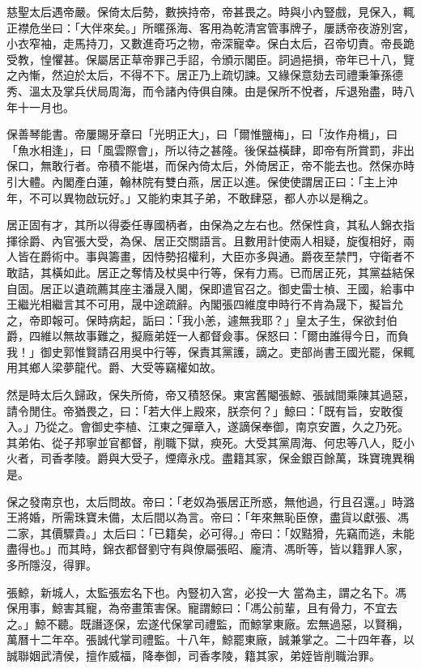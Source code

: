 \begin{pinyinscope}
慈聖太后遇帝嚴。保倚太后勢，數挾持帝，帝甚畏之。時與小內豎戲，見保入，輒正襟危坐曰：「大伴來矣。」所暱孫海、客用為乾清宮管事牌子，屢誘帝夜游別宮，小衣窄袖，走馬持刀，又數進奇巧之物，帝深寵幸。保白太后，召帝切責。帝長跪受教，惶懼甚。保屬居正草帝罪己手詔，令頒示閣臣。詞過挹損，帝年已十八，覽之內慚，然迫於太后，不得不下。居正乃上疏切諫。又緣保意劾去司禮秉筆孫德秀、溫太及掌兵伏局周海，而令諸內侍俱自陳。由是保所不悅者，斥退殆盡，時八年十一月也。

保善琴能書。帝屢賜牙章曰「光明正大」，曰「爾惟鹽梅」，曰「汝作舟楫」，曰「魚水相逢」，曰「風雲際會」，所以待之甚隆。後保益橫肆，即帝有所賞罰，非出保口，無敢行者。帝積不能堪，而保內倚太后，外倚居正，帝不能去也。然保亦時引大體。內閣產白蓮，翰林院有雙白燕，居正以進。保使使謂居正曰：「主上沖年，不可以異物啟玩好。」又能約束其子弟，不敢肆惡，都人亦以是稱之。

居正固有才，其所以得委任專國柄者，由保為之左右也。然保性貪，其私人錦衣指揮徐爵、內官張大受，為保、居正交關語言。且數用計使兩人相疑，旋復相好，兩人皆在爵術中。事與籌畫，因恃勢招權利，大臣亦多與通。爵夜至禁門，守衛者不敢詰，其橫如此。居正之奪情及杖吳中行等，保有力焉。已而居正死，其黨益結保自固。居正以遺疏薦其座主潘晟入閣，保即遣官召之。御史雷士楨、王國，給事中王繼光相繼言其不可用，晟中途疏辭。內閣張四維度申時行不肯為晟下，擬旨允之，帝即報可。保時病起，詬曰：「我小恙，遽無我耶？」皇太子生，保欲封伯爵，四維以無故事難之，擬廕弟姪一人都督僉事。保怒曰：「爾由誰得今日，而負我！」御史郭惟賢請召用吳中行等，保責其黨護，謫之。吏部尚書王國光罷，保輒用其鄉人梁夢龍代。爵、大受等竊權如故。

然是時太后久歸政，保失所倚，帝又積怒保。東宮舊閹張鯨、張誠間乘陳其過惡，請令閒住。帝猶畏之，曰：「若大伴上殿來，朕奈何？」鯨曰：「既有旨，安敢復入。」乃從之。會御史李植、江東之彈章入，遂謫保奉御，南京安置，久之乃死。其弟佑、從子邦寧並官都督，削職下獄，瘐死。大受其黨周海、何忠等八人，貶小火者，司香孝陵。爵與大受子，煙瘴永戍。盡籍其家，保金銀百餘萬，珠寶瑰異稱是。

保之發南京也，太后問故。帝曰：「老奴為張居正所惑，無他過，行且召還。」時潞王將婚，所需珠寶未備，太后間以為言。帝曰：「年來無恥臣僚，盡貨以獻張、馮二家，其價驟貴。」太后曰：「已籍矣，必可得。」帝曰：「奴黠猾，先竊而逃，未能盡得也。」而其時，錦衣都督劉守有與僚屬張昭、龐清、馮昕等，皆以籍罪人家，多所隱沒，得罪。

張鯨，新城人，太監張宏名下也。內豎初入宮，必投一大當為主，謂之名下。馮保用事，鯨害其寵，為帝畫策害保。寵謂鯨曰：「馮公前輩，且有骨力，不宜去之。」鯨不聽。既譖逐保，宏遂代保掌司禮監，而鯨掌東廠。宏無過惡，以賢稱，萬曆十二年卒。張誠代掌司禮監。十八年，鯨罷東廠，誠兼掌之。二十四年春，以誠聯姻武清侯，擅作威福，降奉御，司香孝陵，籍其家，弟姪皆削職治罪。


\end{pinyinscope}

